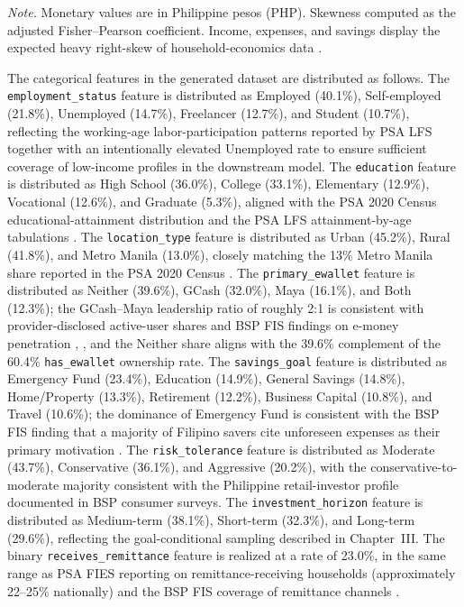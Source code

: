 \documentclass[journal]{./IEEE/IEEEtran}
\begin{document}
\begin{table}[h]
    \vspace{0.5em}
    \raggedright\scriptsize \emph{Note.} Monetary values are in Philippine pesos (PHP). Skewness computed as the adjusted Fisher--Pearson coefficient. Income, expenses, and savings display the expected heavy right-skew of household-economics data \cite{ref54}.
\end{table}

The categorical features in the generated dataset are distributed as follows. The \texttt{employment\_status} feature is distributed as Employed (40.1\%), Self-employed (21.8\%), Unemployed (14.7\%), Freelancer (12.7\%), and Student (10.7\%), reflecting the working-age labor-participation patterns reported by PSA LFS \cite{ref41} together with an intentionally elevated Unemployed rate to ensure sufficient coverage of low-income profiles in the downstream model. The \texttt{education} feature is distributed as High School (36.0\%), College (33.1\%), Elementary (12.9\%), Vocational (12.6\%), and Graduate (5.3\%), aligned with the PSA 2020 Census educational-attainment distribution \cite{ref39} and the PSA LFS attainment-by-age tabulations \cite{ref41}. The \texttt{location\_type} feature is distributed as Urban (45.2\%), Rural (41.8\%), and Metro Manila (13.0\%), closely matching the 13\% Metro Manila share reported in the PSA 2020 Census \cite{ref39}. The \texttt{primary\_ewallet} feature is distributed as Neither (39.6\%), GCash (32.0\%), Maya (16.1\%), and Both (12.3\%); the GCash--Maya leadership ratio of roughly 2:1 is consistent with provider-disclosed active-user shares and BSP FIS findings on e-money penetration \cite{ref9}, \cite{ref35}, and the Neither share aligns with the 39.6\% complement of the 60.4\% \texttt{has\_ewallet} ownership rate. The \texttt{savings\_goal} feature is distributed as Emergency Fund (23.4\%), Education (14.9\%), General Savings (14.8\%), Home/Property (13.3\%), Retirement (12.2\%), Business Capital (10.8\%), and Travel (10.6\%); the dominance of Emergency Fund is consistent with the BSP FIS finding that a majority of Filipino savers cite unforeseen expenses as their primary motivation \cite{ref35}. The \texttt{risk\_tolerance} feature is distributed as Moderate (43.7\%), Conservative (36.1\%), and Aggressive (20.2\%), with the conservative-to-moderate majority consistent with the Philippine retail-investor profile documented in BSP consumer surveys. The \texttt{investment\_horizon} feature is distributed as Medium-term (38.1\%), Short-term (32.3\%), and Long-term (29.6\%), reflecting the goal-conditional sampling described in Chapter~III. The binary \texttt{receives\_remittance} feature is realized at a rate of 23.0\%, in the same range as PSA FIES reporting on remittance-receiving households (approximately 22--25\% nationally) \cite{ref40} and the BSP FIS coverage of remittance channels \cite{ref35}.
\end{document}
